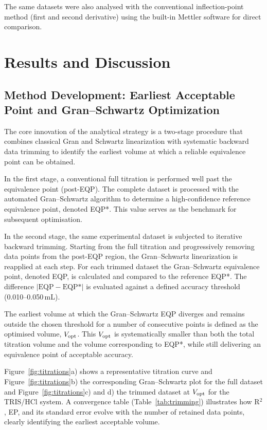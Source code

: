 \documentclass[twoside,twocolumn,9pt]{article}
\begin{document}
The same datasets were also analysed with the conventional inflection-point method (first and second derivative) using the built-in Mettler software for direct comparison.

\section*{Results and Discussion}

\subsection*{Method Development: Earliest Acceptable Point and Gran--Schwartz Optimization}

The core innovation of the analytical strategy is a two-stage procedure that combines classical Gran and Schwartz linearization with systematic backward data trimming to identify the earliest volume at which a reliable equivalence point can be obtained. 

In the first stage, a conventional full titration is performed well past the equivalence point (post-EQP).
The complete dataset is processed with the automated Gran--Schwartz algorithm to determine a high-confidence reference equivalence point, denoted EQP*.
This value serves as the benchmark for subsequent optimisation.

In the second stage, the same experimental dataset is subjected to iterative backward trimming.
Starting from the full titration and progressively removing data points from the post-EQP region, the Gran--Schwartz linearization is reapplied at each step.
For each trimmed dataset the Gran--Schwartz equivalence point, denoted EQP, is calculated and compared to the reference EQP*.
The difference $|\text{EQP} - \text{EQP*}|$ is evaluated against a defined accuracy threshold (0.010--0.050\,mL). 

The earliest volume at which the Gran--Schwartz EQP diverges and remains outside the chosen threshold for a number of consecutive points is defined as the optimised volume, $V_{\rm opt}$.
This $V_{\rm opt}$ is systematically smaller than both the total titration volume and the volume corresponding to EQP*, while still delivering an equivalence point of acceptable accuracy.

Figure~\ref{fig:titrations}a) shows a representative titration curve and Figure~\ref{fig:titrations}b) the corresponding Gran--Schwartz plot for the full dataset and Figure~\ref{fig:titrations}c) and d) the trimmed dataset at $V_{\rm opt}$ for the TRIS/HCl system.
A convergence table (Table~\ref{tab:trimming}) illustrates how R$^2$, EP, and its standard error evolve with the number of retained data points, clearly identifying the earliest acceptable volume.
\end{document}
